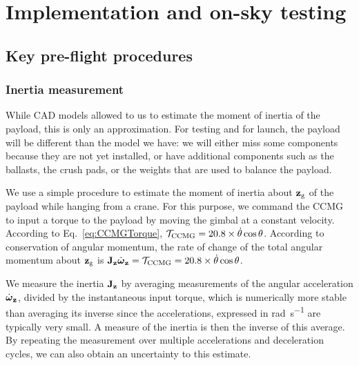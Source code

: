 
\chapter[Implementation and on-sky testing]{Implementation and on-sky testing} %
\label{chap:implementation}


\section{Key pre-flight procedures}
\subsection{Inertia measurement}
While CAD models allowed to us to estimate the moment of inertia of the payload, this is only an approximation. For testing and for launch, the payload will be different than the model we have: we will either miss some components because they are not yet installed, or have additional components such as the ballasts, the crush pads, or the weights that are used to balance the payload.

We use a simple procedure to estimate the moment of inertia about $\textrm{\textbf{z}}_{\textrm{g}}$ of the payload while hanging from a crane. For this purpose, we command the CCMG to input a torque to the payload by moving the gimbal at a constant velocity. According to Eq.~\ref{eq:CCMGTorque}, $\mathcal{T}_{\textrm{CCMG}} =  20.8\times \dot{\theta}\cos\theta$. According to conservation of angular momentum, the rate of change of the total angular momentum about $\textrm{\textbf{z}}_{\textrm{g}}$ is $\textrm{\textbf{J}}_{\textrm{\textbf{z}}}\dot{\boldsymbol\omega}_{\textrm{\textbf{z}}} = \mathcal{T}_{\textrm{CCMG}} = 20.8\times \dot{\theta}\cos\theta$.

We measure the inertia $\textrm{\textbf{J}}_{\textrm{\textbf{z}}}$ by averaging measurements of the angular acceleration $\dot{\boldsymbol\omega}_{\textrm{\textbf{z}}}$, divided by the instantaneous input torque, which is numerically more stable than averaging its inverse since the accelerations, expressed in \si{\radian\per\second} are typically very small. A measure of the inertia is then the inverse of this average. By repeating the measurement over multiple accelerations and deceleration cycles, we can also obtain an uncertainty to this estimate.

